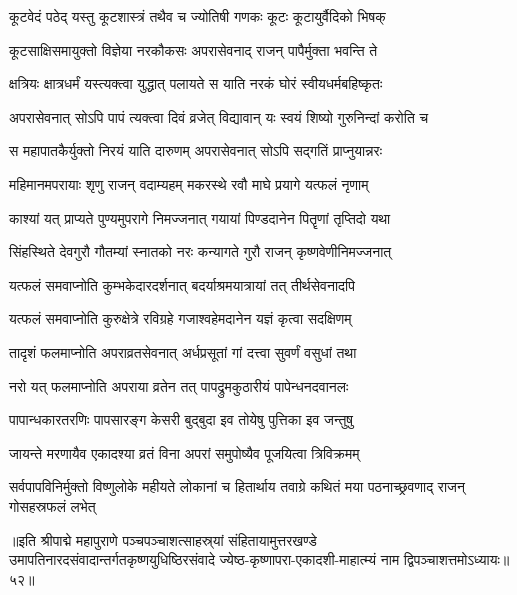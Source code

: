 \twolineshloka
{कूटवेदं पठेद् यस्तु कूटशास्त्रं तथैव च}
{ज्योतिषी गणकः कूटः कूटायुर्वैदिको भिषक्}%

\twolineshloka
{कूटसाक्षिसमायुक्तो विज्ञेया नरकौकसः}
{अपरासेवनाद् राजन् पापैर्मुक्ता भवन्ति ते}%

\twolineshloka
{क्षत्रियः क्षात्रधर्मं यस्त्यक्त्वा युद्धात् पलायते}
{स याति नरकं घोरं स्वीयधर्मबहिष्कृतः}%

\twolineshloka
{अपरासेवनात् सोऽपि पापं त्यक्त्वा दिवं व्रजेत्}
{विद्यावान् यः स्वयं शिष्यो गुरुनिन्दां करोति च}%

\twolineshloka
{स महापातकैर्युक्तो निरयं याति दारुणम्}
{अपरासेवनात् सोऽपि सद्गतिं प्राप्नुयान्नरः}%

\twolineshloka
{महिमानमपरायाः शृणु राजन् वदाम्यहम्}
{मकरस्थे रवौ माघे प्रयागे यत्फलं नृणाम्}%

\twolineshloka
{काश्यां यत् प्राप्यते पुण्यमुपरागे निमज्जनात्}
{गयायां पिण्डदानेन पितॄणां तृप्तिदो यथा}%

\twolineshloka
{सिंहस्थिते देवगुरौ गौतम्यां स्नातको नरः}
{कन्यागते गुरौ राजन् कृष्णवेणीनिमज्जनात्}%

\twolineshloka
{यत्फलं समवाप्नोति कुम्भकेदारदर्शनात्}
{बदर्याश्रमयात्रायां तत् तीर्थसेवनादपि}%

\twolineshloka
{यत्फलं समवाप्नोति कुरुक्षेत्रे रविग्रहे}
{गजाश्वहेमदानेन यज्ञं कृत्वा सदक्षिणम्}%

\twolineshloka
{तादृशं फलमाप्नोति अपराव्रतसेवनात्}
{अर्धप्रसूतां गां दत्त्वा सुवर्णं वसुधां तथा}%

\twolineshloka
{नरो यत् फलमाप्नोति अपराया व्रतेन तत्}
{पापद्रुमकुठारीयं पापेन्धनदवानलः}%

\twolineshloka
{पापान्धकारतरणिः पापसारङ्ग केसरी}
{बुद्बुदा इव तोयेषु पुत्तिका इव जन्तुषु}%

\twolineshloka
{जायन्ते मरणायैव एकादश्या व्रतं विना}
{अपरां समुपोष्यैव पूजयित्वा त्रिविक्रमम्}%

\threelineshloka
{सर्वपापविनिर्मुक्तो विष्णुलोके महीयते}
{लोकानां च हितार्थाय तवाग्रे कथितं मया}
{पठनाच्छ्रवणाद् राजन् गोसहस्रफलं लभेत्}%

॥इति श्रीपाद्मे महापुराणे पञ्चपञ्चाशत्साहस्र्यां संहितायामुत्तरखण्डे उमापतिनारदसंवादान्तर्गतकृष्णयुधिष्ठिरसंवादे ज्येष्ठ-कृष्णापरा-एकादशी-माहात्म्यं नाम द्विपञ्चाशत्तमोऽध्यायः॥५२॥

\genMangalaShloka

\hyperref[sec:ekadashi_mahatmyam_padma_puranam]{\closesub}
\clearpage

\label{sec:padma-jyeshtha-shukla-nirjala}

